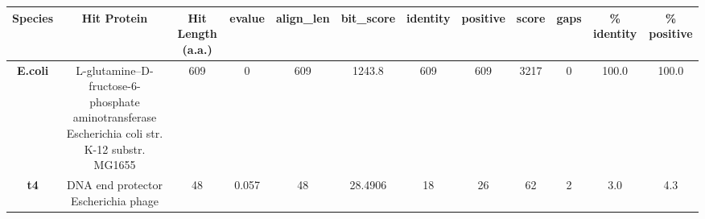 \begin{tabular}{|c|c|c|c|c|c|c|c|c|c|c|c|} \hline
\textbf{Species} & \textbf{Hit Protein} & \textbf{Hit Length (a.a.)} & \textbf{evalue} & \textbf{align\_len} & \textbf{bit\_score} & \textbf{identity} & \textbf{positive} & \textbf{score} & \textbf{gaps} & \textbf{\% identity} & \textbf{\% positive} \\ \hline
\textbf{E.coli} & L-glutamine--D-fructose-6-phosphate aminotransferase Escherichia coli str. K-12 substr. MG1655 & 609 & 0 & 609 & 1243.8 & 609 & 609 & 3217 & 0 & 100.0 & 100.0\\
\textbf{t4} & DNA end protector Escherichia phage  & 48 & 0.057 & 48 & 28.4906 & 18 & 26 & 62 & 2 & 3.0 & 4.3\\
\hline \end{tabular}
